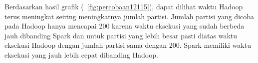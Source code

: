 Berdasarkan hasil grafik (~\ref{fig:percobaan12115}), dapat dilihat waktu Hadoop terus meningkat seiring meningkatnya jumlah partisi. Jumlah partisi yang dicoba pada Hadoop hanya mencapai 200 karena waktu eksekusi yang sudah berbeda jauh dibanding Spark dan untuk partisi yang lebih besar pasti diatas waktu eksekusi Hadoop dengan jumlah partisi sama dengan 200. Spark memiliki waktu eksekusi yang jauh lebih cepat dibanding Hadoop. 


